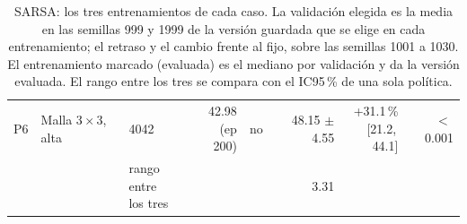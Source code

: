 \begin{table}[H]
\begin{tabular}{lllrlrrr}
P6 & \makecell[l]{Malla $3 \times 3$,\\{}alta} & 4042 & \makecell[r]{42.98\\{}(ep 200)} & no & \makecell[r]{48.15\\{}$\pm$ 4.55} & \makecell[r]{+31.1\,\%\\{}[21.2,\,44.1]} & $<$\,0.001 \\
 & & \makecell[l]{rango entre\\{}los tres} & & & 3.31 & & \\
\bottomrule
\end{tabular}
\caption[Entrenamientos de SARSA]{SARSA: los tres entrenamientos de cada caso. La validación elegida es la media en las semillas 999 y 1999 de la versión guardada que se elige en cada entrenamiento; el retraso y el cambio frente al fijo, sobre las semillas 1001 a 1030. El entrenamiento marcado (evaluada) es el mediano por validación y da la versión evaluada. El rango entre los tres se compara con el IC95\,\% de una sola política.}
\label{tab:veredicto-bases-sarsa}
\end{table}

